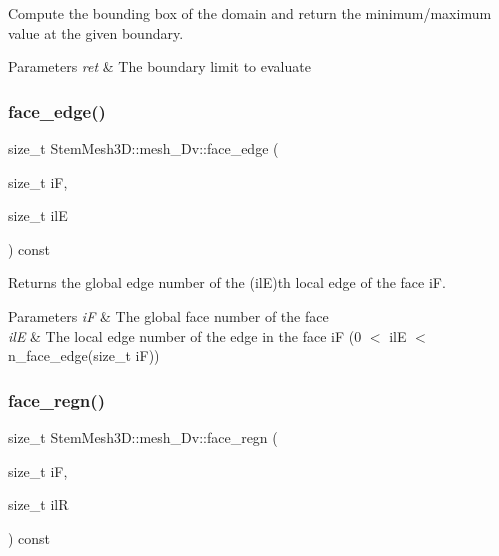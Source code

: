 Compute the bounding box of the domain and return the minimum/maximum value at the given boundary. 


\begin{DoxyParams}{Parameters}
{\em ret} & The boundary limit to evaluate \\
\hline
\end{DoxyParams}
\mbox{\label{classStemMesh3D_1_1mesh__3Dv_a70f328491a6660c05914c9226e297ecc}} 
\subsubsection{\texorpdfstring{face\+\_\+edge()}{face\_edge()}}
{\footnotesize\ttfamily size\+\_\+t Stem\+Mesh3\+D\+::mesh\+\_\+Dv\+::face\+\_\+edge (\begin{DoxyParamCaption}\item[{size\+\_\+t}]{iF,  }\item[{size\+\_\+t}]{ilE }\end{DoxyParamCaption}) const}



Returns the global edge number of the (ilE)\textquotesingle{}th local edge of the face iF. 


\begin{DoxyParams}{Parameters}
{\em iF} & The global face number of the face \\
\hline
{\em ilE} & The local edge number of the edge in the face iF (0 $<$ ilE $<$ n\+\_\+face\+\_\+edge(size\+\_\+t i\+F)) \\
\hline
\end{DoxyParams}
\mbox{\label{classStemMesh3D_1_1mesh__3Dv_afd4c48e4133adad4c31e6fe8bfb96c2a}} 
\subsubsection{\texorpdfstring{face\+\_\+regn()}{face\_regn()}}
{\footnotesize\ttfamily size\+\_\+t Stem\+Mesh3\+D\+::mesh\+\_\+Dv\+::face\+\_\+regn (\begin{DoxyParamCaption}\item[{size\+\_\+t}]{iF,  }\item[{size\+\_\+t}]{ilR }\end{DoxyParamCaption}) const}



